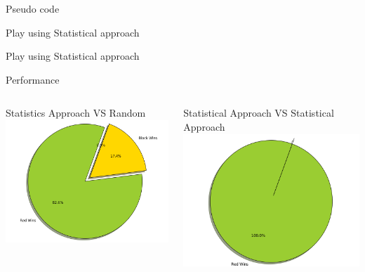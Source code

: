 \documentclass[aspectratio=169]{beamer}
\begin{document}
\begin{frame}{Pseudo code}
	\begin{block}{Play using Statistical approach}
		\Statistical
	\end{block}
	
	\begin{block}{Play using Statistical approach}
		\StatisticalPlay
	\end{block}
\end{frame}
\begin{frame}{Performance}
	    \begin{columns}
	 	\begin{column}{0.5\textwidth}
	 	Statistics Approach VS Random
			\centering
			\includegraphics[scale = .35]{statVsrand.png}
	 	\end{column}
 		\begin{column}{0.5\textwidth}
 		Statistical Approach VS Statistical Approach
			\centering
			\includegraphics[scale = 0.35]{statVsstat.png}	
	 	\end{column}
	 \end{columns}
\end{frame}
\end{document}
